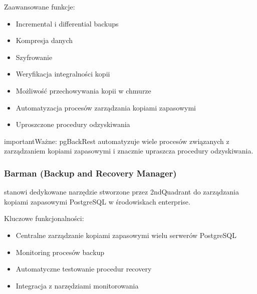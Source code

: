 \documentclass[letterpaper,10pt,polish]{sphinxmanual}
\begin{document}
\sphinxAtStartPar
Zaawansowane funkcje:
\begin{itemize}
\item {} 
\sphinxAtStartPar
Incremental i differential backups

\item {} 
\sphinxAtStartPar
Kompresja danych

\item {} 
\sphinxAtStartPar
Szyfrowanie

\item {} 
\sphinxAtStartPar
Weryfikacja integralności kopii

\item {} 
\sphinxAtStartPar
Możliwość przechowywania kopii w chmurze

\item {} 
\sphinxAtStartPar
Automatyzacja procesów zarządzania kopiami zapasowymi

\item {} 
\sphinxAtStartPar
Uproszczone procedury odzyskiwania

\end{itemize}

\begin{sphinxadmonition}{important}{Ważne:}
\sphinxAtStartPar
pgBackRest automatyzuje wiele procesów związanych z zarządzaniem kopiami zapasowymi i znacznie upraszcza procedury odzyskiwania.
\end{sphinxadmonition}


\subsubsection{Barman (Backup and Recovery Manager)}
\label{\detokenize{rozdzial2/Kopie_zapasowe_i_odzyskiwanie_danych/kopie_zapasowe_i_odzyskiwanie_danych:barman-backup-and-recovery-manager}}
\sphinxAtStartPar
{} stanowi dedykowane narzędzie stworzone przez 2ndQuadrant do zarządzania kopiami zapasowymi PostgreSQL w środowiskach enterprise.

\sphinxAtStartPar
Kluczowe funkcjonalności:
\begin{itemize}
\item {} 
\sphinxAtStartPar
Centralne zarządzanie kopiami zapasowymi wielu serwerów PostgreSQL

\item {} 
\sphinxAtStartPar
Monitoring procesów backup

\item {} 
\sphinxAtStartPar
Automatyczne testowanie procedur recovery

\item {} 
\sphinxAtStartPar
Integracja z narzędziami monitorowania

\end{itemize}
\end{document}
